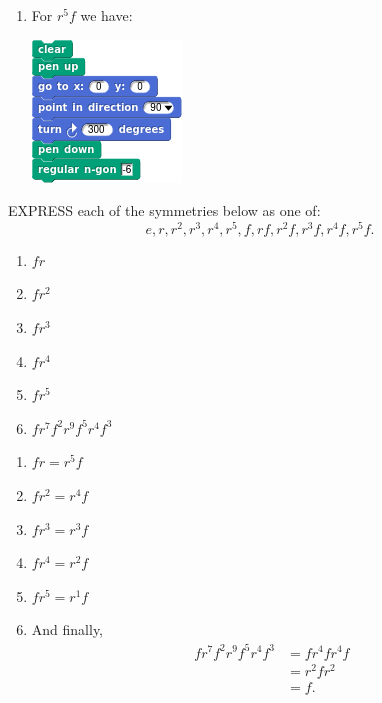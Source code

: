 \documentclass[noauthor,nooutcomes,12pt,hints,handout]{ximera}
\begin{document}
\begin{question}
\begin{freeResponse}
\begin{enumerate}
\begin{center}
      \end{center}
      \item For $r^5f$ we have:
      \begin{center}
        \includegraphics[width=.3\textwidth]{r5fHexSCRIPT.png}   \qquad {}
      \end{center}
    \end{enumerate}
    \end{freeResponse}
\end{question}
\mynewpage


\begin{question}
 EXPRESS each of the symmetries below as one of:
 \[
 e,r,r^2,r^3,r^4,r^5,f,rf,r^2f,r^3f, r^4f,r^5f.
 \]

 \begin{enumerate}
 \item $fr$
 \item $fr^2$
 \item $fr^3$
 \item $fr^4$
 \item $fr^5$
 \item $fr^7f^2r^9f^5r^4f^3$
 \end{enumerate}
 \begin{freeResponse}
   \begin{enumerate}
   \item $fr = r^5f$
   \item $fr^2 = r^4f$
   \item $fr^3 = r^3f$
   \item $fr^4 = r^2f$
   \item $fr^5 = r^1f$
   \item And finally,
     \begin{align*}
       fr^7f^2r^9f^5r^4f^3 &= fr^4fr^4f \\
       &= r^2f r^2\\
       &= f.
     \end{align*}
   \end{enumerate}
 \end{freeResponse}
\end{question}
\end{document}
